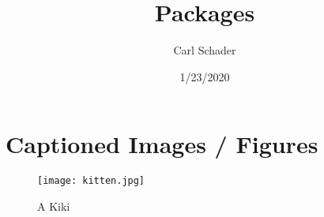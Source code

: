\documentclass{article}
\title{Packages}
\date{1/23/2020}
\author{Carl Schader}
\begin{document}
	\maketitle

	\newpage
	\section{Captioned Images / Figures}
	\begin{figure}[h!] %
		\texttt{[image: kitten.jpg]} %
		\caption{A Kiki} %
		\label{fig:kitten} %
	\end{figure}
\end{document}
